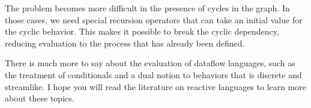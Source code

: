 The problem becomes more difficult in the presence of cycles in the graph. In
those cases, we need special recursion operators that can take an initial value
for the cyclic behavior. This makes it possible to break the cyclic dependency,
reducing evaluation to the process that has already been defined.

There is much more to say about the evaluation of dataflow languages, such as
the treatment of conditionals and a dual notion to behaviors that is discrete
and streamlike. I hope you will read the literature on reactive languages to
learn more about these topics.


\secup
